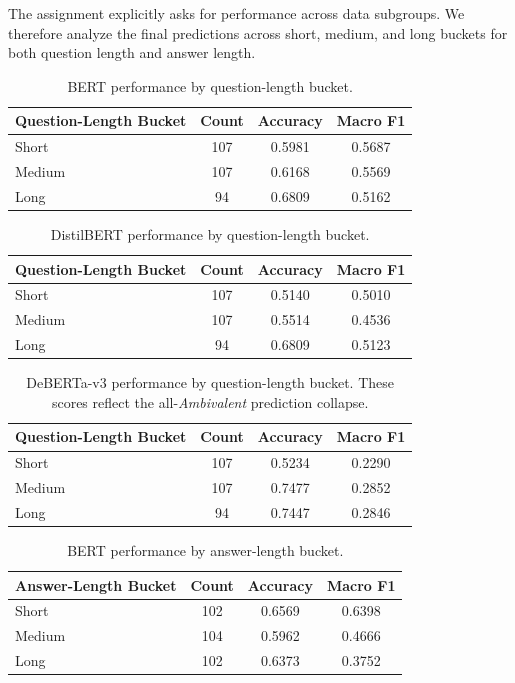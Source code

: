 The assignment explicitly asks for performance across data subgroups. We therefore analyze the final predictions across short, medium, and long buckets for both question length and answer length.

\begin{table}[h]
\centering
\small
\begin{tabularx}{\textwidth}{Xccc}
\toprule
Question-Length Bucket & Count & Accuracy & Macro F1 \\
\midrule
Short & 107 & 0.5981 & 0.5687 \\
Medium & 107 & 0.6168 & 0.5569 \\
Long & 94 & 0.6809 & 0.5162 \\
\bottomrule
\end{tabularx}
\caption{BERT performance by question-length bucket.}
\label{tab:question-subgroups}
\end{table}

\begin{table}[h]
\centering
\small
\begin{tabularx}{\textwidth}{Xccc}
\toprule
Question-Length Bucket & Count & Accuracy & Macro F1 \\
\midrule
Short & 107 & 0.5140 & 0.5010 \\
Medium & 107 & 0.5514 & 0.4536 \\
Long & 94 & 0.6809 & 0.5123 \\
\bottomrule
\end{tabularx}
\caption{DistilBERT performance by question-length bucket.}
\label{tab:distilbert-question-subgroups}
\end{table}

\begin{table}[h]
\centering
\small
\begin{tabularx}{\textwidth}{Xccc}
\toprule
Question-Length Bucket & Count & Accuracy & Macro F1 \\
\midrule
Short & 107 & 0.5234 & 0.2290 \\
Medium & 107 & 0.7477 & 0.2852 \\
Long & 94 & 0.7447 & 0.2846 \\
\bottomrule
\end{tabularx}
\caption{DeBERTa-v3 performance by question-length bucket. These scores reflect the all-\emph{Ambivalent} prediction collapse.}
\label{tab:deberta-question-subgroups}
\end{table}

\begin{table}[h]
\centering
\small
\begin{tabularx}{\textwidth}{Xccc}
\toprule
Answer-Length Bucket & Count & Accuracy & Macro F1 \\
\midrule
Short & 102 & 0.6569 & 0.6398 \\
Medium & 104 & 0.5962 & 0.4666 \\
Long & 102 & 0.6373 & 0.3752 \\
\bottomrule
\end{tabularx}
\caption{BERT performance by answer-length bucket.}
\label{tab:answer-subgroups}
\end{table}


